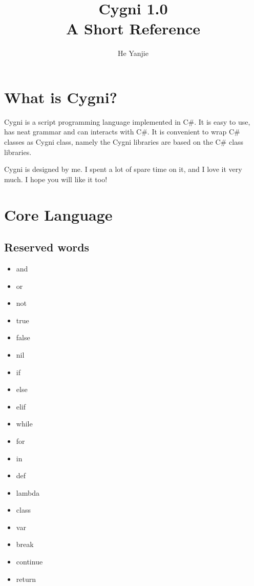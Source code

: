 \documentclass[]{article}
\title{Cygni 1.0\\ A Short Reference}
\author{He Yanjie}
\begin{document}
\maketitle

\begin{abstract}

\end{abstract}

\section{What is Cygni?}
Cygni is a script programming language implemented in C\#. It is easy to use, has neat grammar and can interacts with C\#. It is convenient to wrap C\# classes as Cygni class, namely the Cygni libraries are based on the C\# class libraries.

Cygni is designed by me. I spent a lot of spare time on it, and I love it very much. I hope you will like it too!

\section{Core Language}
\subsection{Reserved words}
\begin{itemize}
	\item and
	\item or
	\item not
	\item true
	\item false
	\item nil
	\item if
	\item else
	\item elif
	\item while
	\item for
	\item in
	\item def
	\item lambda
	\item class
	\item var
	\item break
	\item continue
	\item return	
\end{itemize}
\end{document}

